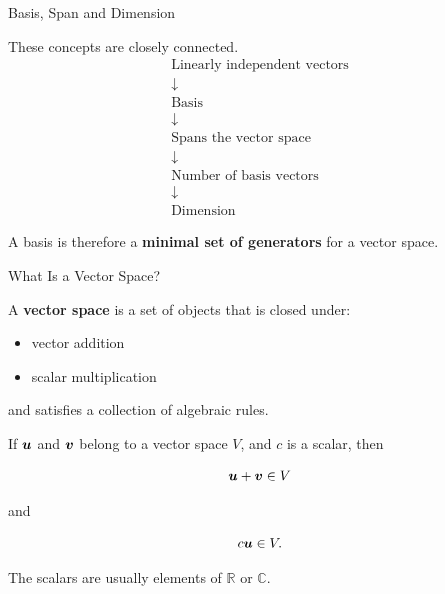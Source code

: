 \begin{frame}{Basis, Span and Dimension}

These concepts are closely connected.
\vspace{-0.1cm}
\[
\boxed{
\begin{array}{c}
\text{Linearly independent vectors}\\[3pt]
\downarrow\\[3pt]
\text{Basis}\\[3pt]
\downarrow\\[3pt]
\text{Spans the vector space}\\[3pt]
\downarrow\\[3pt]
\text{Number of basis vectors}\\[3pt]
\downarrow\\[3pt]
\text{Dimension}
\end{array}
}
\]

A basis is therefore a \textbf{minimal set of generators} for
a vector space.

\end{frame}



\begin{frame}{What Is a Vector Space?}

A \textbf{vector space} is a set of objects that is closed under:

\begin{itemize}
    \item vector addition
    \item scalar multiplication
\end{itemize}

and satisfies a collection of algebraic rules.

\vspace{0.4cm}

If $\bm{u}$ and $\bm{v}$ belong to a vector space $V$, and
$c$ is a scalar, then

\[
\bm{u}+\bm{v}\in V
\]

and

\[
c\bm{u}\in V.
\]

\vspace{0.4cm}

The scalars are usually elements of $\mathbb{R}$ or $\mathbb{C}$.

\end{frame}



